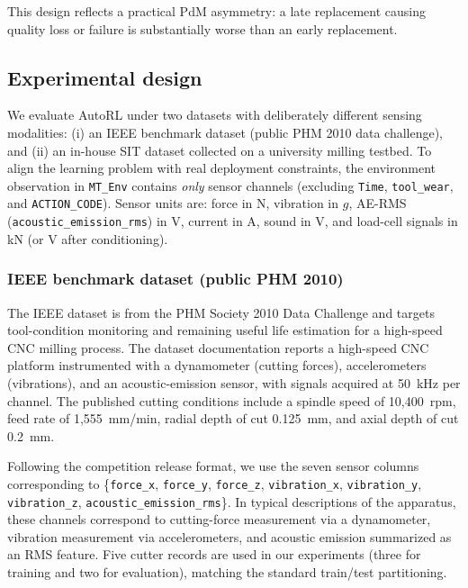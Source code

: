 \documentclass[sn-basic]{sn-jnl} %
\begin{document}
This design reflects a practical PdM asymmetry: a late replacement causing quality loss or failure is substantially worse than an early replacement.

\subsection{Experimental design} \label{sec:experiment} 

We evaluate AutoRL under two datasets with deliberately different sensing modalities: (i) an IEEE benchmark dataset (public PHM 2010 data challenge), and (ii) an in-house SIT dataset collected on a university milling testbed. To align the learning problem with real deployment constraints, the environment observation in \texttt{MT\_Env} contains \emph{only} sensor channels (excluding \texttt{Time}, \texttt{tool\_wear}, and \texttt{ACTION\_CODE}). Sensor units are: force in N, vibration in $g$, AE-RMS (\texttt{acoustic\_emission\_rms}) in V, current in A, sound in V, and load-cell signals in kN (or V after conditioning).

\subsubsection{IEEE benchmark dataset (public PHM 2010)}
The IEEE dataset \cite{PHMdata2010} is from the PHM Society 2010 Data Challenge and targets tool-condition monitoring and remaining useful life estimation for a high-speed CNC milling process. The dataset documentation reports a high-speed CNC platform instrumented with a dynamometer (cutting forces), accelerometers (vibrations), and an acoustic-emission sensor, with signals acquired at 50~kHz per channel. The published cutting conditions include a spindle speed of 10{,}400~rpm, feed rate of 1{,}555~mm/min, radial depth of cut 0.125~mm, and axial depth of cut 0.2~mm.

Following the competition release format, we use the seven sensor columns corresponding to \{\texttt{force\_x}, \texttt{force\_y}, \texttt{force\_z}, \texttt{vibration\_x}, \texttt{vibration\_y}, \texttt{vibration\_z}, \texttt{acoustic\_emission\_rms}\}. In typical descriptions of the apparatus, these channels correspond to cutting-force measurement via a dynamometer, vibration measurement via accelerometers, and acoustic emission summarized as an RMS feature. Five cutter records are used in our experiments (three for training and two for evaluation), matching the standard train/test partitioning.
\end{document}

